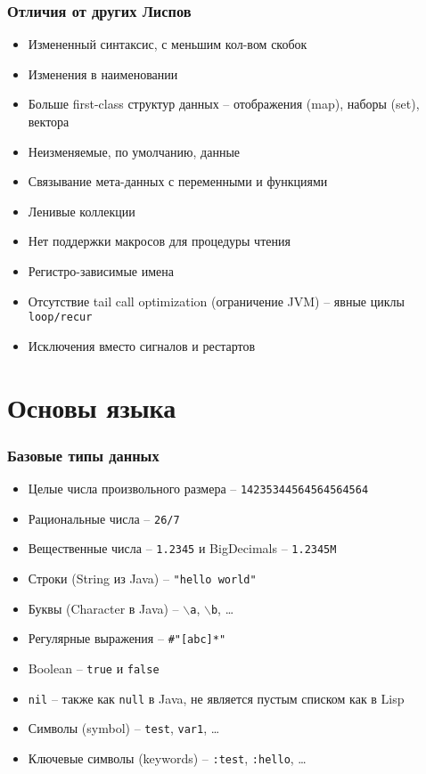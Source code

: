 \documentclass[ignorenonframetext]{beamer}
\begin{document}
\begin{frame}[t]
  \frametitle{Отличия от других Лиспов}
  \begin{itemize}
  \item Измененный синтаксис, с меньшим кол-вом скобок
  \item Изменения в наименовании
  \item Больше first-class структур данных -- отображения (map), наборы (set), вектора
  \item Неизменяемые, по умолчанию, данные
  \item Связывание мета-данных с переменными и функциями
  \item Ленивые коллекции
  \item Нет поддержки макросов для процедуры чтения
  \item Регистро-зависимые имена
  \item Отсутствие tail call optimization (ограничение JVM) -- явные циклы \texttt{loop/recur}
  \item Исключения вместо сигналов и рестартов
  \end{itemize}
\end{frame}


\section{Основы языка}

\begin{frame}[t]
  \frametitle{Базовые типы данных}
  \begin{itemize}
  \item Целые числа произвольного размера -- \texttt{14235344564564564564}
  \item Рациональные числа -- \texttt{26/7}
  \item Вещественные числа -- \texttt{1.2345} и BigDecimals -- \texttt{1.2345M}
  \item Строки (String из Java) -- \texttt{"hello world"}
  \item Буквы (Character в Java) -- \texttt{$\backslash{}$a}, \texttt{$\backslash{}$b}, \ldots{}
  \item Регулярные выражения -- \texttt{\#"[abc]*"}
  \item Boolean -- \texttt{true} и \texttt{false}
  \item \texttt{nil} -- также как \texttt{null} в Java, не является пустым списком как в Lisp
  \item Символы (symbol) -- \texttt{test}, \texttt{var1}, \ldots{}
  \item Ключевые символы (keywords) -- \texttt{:test}, \texttt{:hello}, \ldots{}
  \end{itemize}
\end{frame}
\end{document}

